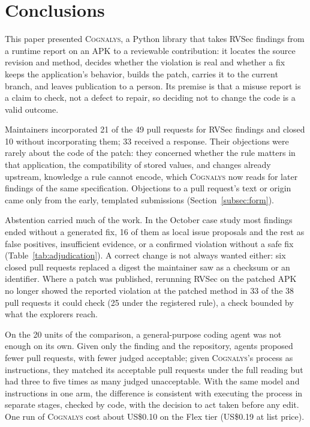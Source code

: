 \documentclass[conference]{IEEEtran}
\newcommand{\system}{\textsc{Cognalys}}
\begin{document}
\section{Conclusions}
\label{sec:conclusion}

This paper presented \system{}, a Python library that takes RVSec findings from
a runtime report on an APK to a reviewable contribution: it locates the source
revision and method, decides whether the violation is real and whether a fix
keeps the application's behavior, builds the patch, carries it to the current
branch, and leaves publication to a person. Its premise is that a misuse report
is a claim to check, not a defect to repair, so deciding not to change the code
is a valid outcome.

Maintainers incorporated 21 of the 49 pull requests for RVSec findings and
closed 10 without incorporating them; 33 received a response. Their objections
were rarely about the code of the patch: they concerned whether the rule
matters in that application, the compatibility of stored values, and changes
already upstream, knowledge a rule cannot encode, which \system{} now reads
for later findings of the same specification. Objections to a pull request's text
or origin came only from the early, templated submissions (Section~\ref{subsec:form}).

Abstention carried much of the work. In the October case study most findings
ended without a generated fix, 16 of them as local issue proposals and the
rest as false positives, insufficient evidence, or a confirmed violation
without a safe fix (Table~\ref{tab:adjudication}). A correct change is not
always wanted either: six closed pull requests replaced a digest the maintainer
saw as a checksum or an identifier. Where a patch was published, rerunning RVSec on
the patched APK no longer showed the reported violation at the patched method
in 33 of the 38 pull requests it could check (25 under the registered rule), a
check bounded by what the explorers reach.

On the 20 units of the comparison, a general-purpose coding agent was not enough on its own. Given only the
finding and the repository, agents proposed fewer pull requests, with fewer
judged acceptable; given \system{}'s process as instructions, they matched its
acceptable pull requests under the full reading but had three to five times as many judged
unacceptable. With the same model and instructions in one arm, the difference is consistent with
executing the process in separate stages, checked by code, with the decision to
act taken before any edit. One run of \system{} cost about US\$0.10 on the Flex tier
(US\$0.19 at list price).
\end{document}
